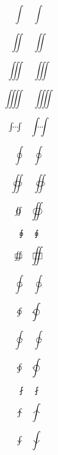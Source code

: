 \documentclass{article}
\begin{document}
\[
\textstyle \int \quad \displaystyle \int
\]

\[
\textstyle \iint \quad \displaystyle \iint
\]

\[
\textstyle \iiint \quad \displaystyle \iiint
\]

\[
\textstyle \iiiint \quad \displaystyle \iiiint
\]

\[
\textstyle \dotsint \quad \displaystyle \dotsint
\]

\[
\textstyle \oint \quad \displaystyle \oint
\]

\[
\textstyle \oiint \quad \displaystyle \oiint
\]

\[
\textstyle \varoiint \quad \displaystyle \oiint
\]

\[
\textstyle \sqint \quad \displaystyle \sqint
\]

\[
\textstyle \sqiint \quad \displaystyle \sqiint
\]

\[
\textstyle \ointctrclockwise \quad \displaystyle \ointctrclockwise
\]

\[
\textstyle \ointclockwise \quad \displaystyle \ointclockwise
\]

\[
\textstyle \varointclockwise \quad \displaystyle \varointclockwise
\]

\[
\textstyle \varointctrclockwise \quad \displaystyle \varointctrclockwise
\]

\[
\textstyle \fint \quad \displaystyle \fint
\]

\[
\textstyle \landupint \quad \displaystyle \landupint
\]

\[
\textstyle \landdownint \quad \displaystyle \landdownint
\]
\end{document}
